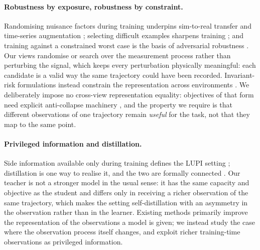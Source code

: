 \paragraph{Robustness by exposure, robustness by constraint.}
Randomising nuisance factors during training underpins sim-to-real transfer \cite{tobin2017domainrand} and
time-series augmentation \cite{wen2021augmentation}; selecting difficult examples sharpens training
\cite{shrivastava2016ohem}; and training against a constrained worst case is the basis of adversarial robustness
\cite{madry2018towards}. Our views randomise or search over the measurement process rather than perturbing the
signal, which keeps every perturbation physically meaningful: each candidate is a valid way the same trajectory
could have been recorded. Invariant-risk formulations instead constrain the representation across environments
\cite{arjovsky2019irm}. We deliberately impose no cross-view representation equality: objectives of that form
need explicit anti-collapse machinery \cite{chen2020simclr,grill2020byol,bardes2022vicreg}, and the property we
require is that different observations of one trajectory remain \emph{useful} for the task, not that they map to
the same point.

\paragraph{Privileged information and distillation.}
Side information available only during training defines the LUPI setting \cite{vapnik2015lupi}; distillation
\cite{hinton2015distilling} is one way to realise it, and the two are formally connected
\cite{lopezpaz2016unifying}. Our teacher is not a stronger model in the usual sense: it has the same capacity and
objective as the student and differs only in receiving a richer observation of the same trajectory, which makes
the setting self-distillation with an asymmetry in the observation rather than in the learner. Existing methods
primarily improve the representation of the observations a model is given; we instead study the case where the
observation process itself changes, and exploit richer training-time observations as privileged information.
